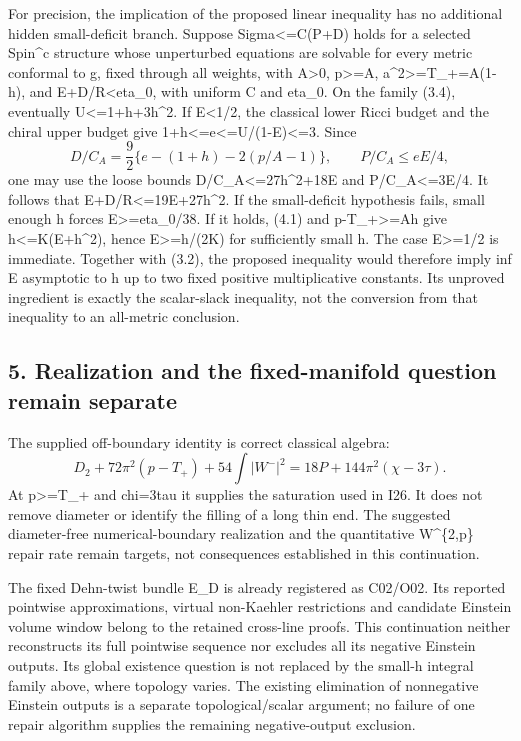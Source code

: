 \documentclass[
  10pt,
]{article}
\begin{document}
For precision, the implication of the proposed linear inequality has no
additional hidden small-deficit branch. Suppose Sigma\textless=C(P+D)
holds for a selected Spin\^{}c structure whose unperturbed equations are
solvable for every metric conformal to g, fixed through all weights,
with A\textgreater0, p\textgreater=A, a\^{}2\textgreater=T\_+=A(1-h),
and E+D/R\textless eta\_0, with uniform C and eta\_0. On the family
(3.4), eventually U\textless=1+h+3h\^{}2. If E\textless1/2, the
classical lower Ricci budget and the chiral upper budget give
1+h\textless=e\textless=U/(1-E)\textless=3. Since \[
 D/C_A=\frac92\{e-(1+h)-2(p/A-1)\},\qquad P/C_A\le eE/4,
\] one may use the loose bounds D/C\_A\textless=27h\^{}2+18E and
P/C\_A\textless=3E/4. It follows that E+D/R\textless=19E+27h\^{}2. If
the small-deficit hypothesis fails, small enough h forces
E\textgreater=eta\_0/38. If it holds, (4.1) and p-T\_+\textgreater=Ah
give h\textless=K(E+h\^{}2), hence E\textgreater=h/(2K) for sufficiently
small h. The case E\textgreater=1/2 is immediate. Together with (3.2),
the proposed inequality would therefore imply inf E asymptotic to h up
to two fixed positive multiplicative constants. Its unproved ingredient
is exactly the scalar-slack inequality, not the conversion from that
inequality to an all-metric conclusion.

\hypertarget{realization-and-the-fixed-manifold-question-remain-separate}{%
\subsection{5. Realization and the fixed-manifold question remain
separate}\label{realization-and-the-fixed-manifold-question-remain-separate}}

The supplied off-boundary identity is correct classical algebra: \[
 D_2+72\pi^2(p-T_+)+54\int|W^-|^2
      =18P+144\pi^2(\chi-3\tau).                         \tag{5.1}
\] At p\textgreater=T\_+ and chi=3tau it supplies the saturation used in
I26. It does not remove diameter or identify the filling of a long thin
end. The suggested diameter-free numerical-boundary realization and the
quantitative W\^{}\{2,p\} repair rate remain targets, not consequences
established in this continuation.

The fixed Dehn-twist bundle E\_D is already registered as C02/O02. Its
reported pointwise approximations, virtual non-Kaehler restrictions and
candidate Einstein volume window belong to the retained cross-line
proofs. This continuation neither reconstructs its full pointwise
sequence nor excludes all its negative Einstein outputs. Its global
existence question is not replaced by the small-h integral family above,
where topology varies. The existing elimination of nonnegative Einstein
outputs is a separate topological/scalar argument; no failure of one
repair algorithm supplies the remaining negative-output exclusion.
\end{document}
